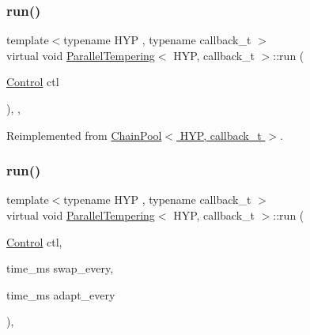 \mbox{\label{class_parallel_tempering_a6824837893cf52eb1cac362e78e483b9}} 
\subsubsection{\texorpdfstring{run()}{run()}\hspace{0.1cm}{\footnotesize\ttfamily [1/2]}}
{\footnotesize\ttfamily template$<$typename H\+YP , typename callback\+\_\+t $>$ \\
virtual void \hyperlink{class_parallel_tempering}{Parallel\+Tempering}$<$ H\+YP, callback\+\_\+t $>$\+::run (\begin{DoxyParamCaption}\item[{\hyperlink{struct_control}{Control}}]{ctl }\end{DoxyParamCaption})\hspace{0.3cm}{\ttfamily [inline]}, {\ttfamily [override]}, {\ttfamily [virtual]}}



Reimplemented from \hyperlink{class_chain_pool_af5f0e391f9794ff89f29296c8b41bf8e}{Chain\+Pool$<$ H\+Y\+P, callback\+\_\+t $>$}.

\mbox{\label{class_parallel_tempering_a40df4781b1d06acff7b0902c4d4a5a87}} 
\subsubsection{\texorpdfstring{run()}{run()}\hspace{0.1cm}{\footnotesize\ttfamily [2/2]}}
{\footnotesize\ttfamily template$<$typename H\+YP , typename callback\+\_\+t $>$ \\
virtual void \hyperlink{class_parallel_tempering}{Parallel\+Tempering}$<$ H\+YP, callback\+\_\+t $>$\+::run (\begin{DoxyParamCaption}\item[{\hyperlink{struct_control}{Control}}]{ctl,  }\item[{time\+\_\+ms}]{swap\+\_\+every,  }\item[{time\+\_\+ms}]{adapt\+\_\+every }\end{DoxyParamCaption})\hspace{0.3cm}{\ttfamily [inline]}, {\ttfamily [virtual]}}


